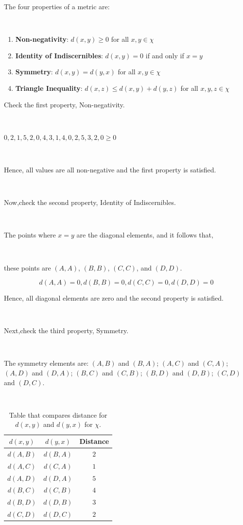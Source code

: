 \documentclass{article}
\begin{document}
\parbox{\textwidth}{The four properties of a metric are:}\\

\begin{enumerate}
    \item \textbf{Non-negativity}: $d(x,y) \geq 0$ for all $x,y \in \chi$
    \item \textbf{Identity of Indiscernibles}: $d(x,y) = 0$ if and only if $x = y$
    \item \textbf{Symmetry}: $d(x,y) = d(y,x)$ for all $x,y \in \chi$
    \item \textbf{Triangle Inequality}: $d(x,z) \leq d(x,y) + d(y,z)$ for all $x,y,z \in \chi$
\end{enumerate}

\parbox{\textwidth}{Check the first property, Non-negativity.}\\

\parbox{\textwidth}{$0,2,1,5,2,0,4,3,1,4,0,2,5,3,2,0 \geq 0$}\\

\parbox{\textwidth}{Hence, all values are all non-negative and the first property is satisfied.}\\

\parbox{\textwidth}{Now,check the second property, Identity of Indiscernibles.}\\

\parbox{\textwidth}{The points where $x=y$ are the diagonal elements, and it follows that,}\\

\parbox{\textwidth}{these points are $(A,A)$, $(B,B)$, $(C,C)$, and $(D,D)$.}

$$d(A,A) = 0 , d(B,B) = 0 , d(C,C) = 0 , d(D,D) = 0$$

\parbox{\textwidth}{Hence, all diagonal elements are zero and the second property is satisfied.}\\

\parbox{\textwidth}{Next,check the third property, Symmetry.}\\

\parbox{\textwidth}{The symmetry elements are: $(A,B)$ and $(B,A)$; $(A,C)$ and $(C,A)$; $(A,D)$ and $(D,A)$; $(B,C)$ and $(C,B)$; $(B,D)$ and $(D,B)$; $(C,D)$ and $(D,C)$.}\\

\begin{table}[h]
\centering
\begin{tabular}{|c|c|c|}
\hline
$d(x,y)$ & $d(y,x)$ & Distance \\
\hline
$d(A,B)$ & $d(B,A)$  & $2$ \\
$d(A,C)$ & $d(C,A)$  & $1$ \\
$d(A,D)$ & $d(D,A)$  & $5$ \\
$d(B,C)$ & $d(C,B)$  & $4$ \\
$d(B,D)$ & $d(D,B)$  & $3$ \\
$d(C,D)$ & $d(D,C)$  & $2$ \\
\hline
\end{tabular}
\caption{Table that compares distance for $d(x,y)$ and $d(y,x)$ for $\chi$.}
\label{tab:solution}
\end{table}
\end{document}
